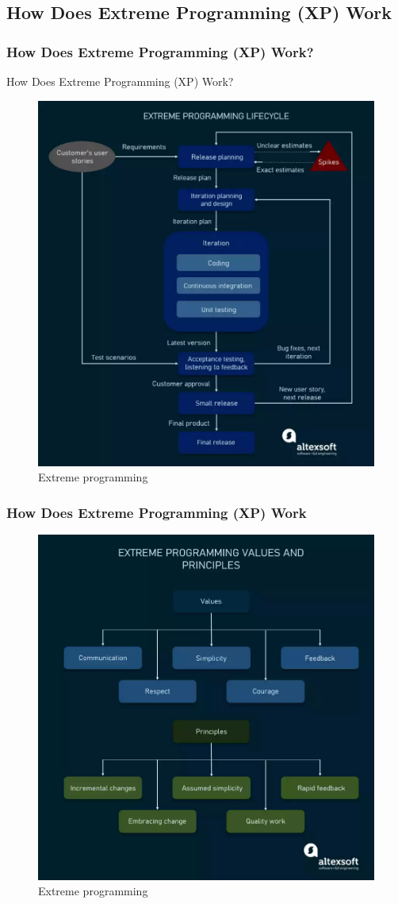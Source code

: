\documentclass[
	11pt, 
]{beamer}
\begin{document}
\subsection{How Does Extreme Programming (XP) Work}
\begin{frame}
	\frametitle{How Does Extreme Programming (XP) Work?}
	How Does Extreme Programming (XP) Work?
	\bigskip %
	\begin{figure}
		\includegraphics[width=0.475\linewidth]{ext3.pdf}
		\caption{Extreme programming \cite{p5}}
	\end{figure}
\end{frame}
\begin{frame}
	\frametitle{How Does Extreme Programming (XP) Work}
	\begin{figure}
		\includegraphics[width=0.55\linewidth]{ext4.pdf}
		\caption{Extreme programming \cite{p5}}
	\end{figure}
\end{frame}
\end{document}
